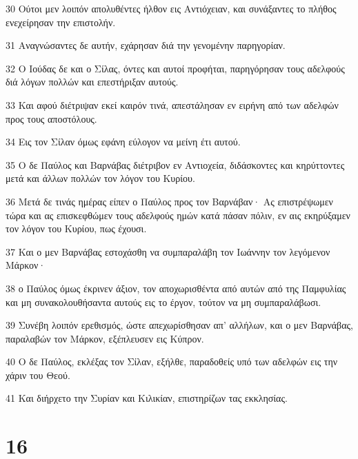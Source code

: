 \par 30 Ούτοι μεν λοιπόν απολυθέντες ήλθον εις Αντιόχειαν, και συνάξαντες το πλήθος ενεχείρησαν την επιστολήν.
\par 31 Αναγνώσαντες δε αυτήν, εχάρησαν διά την γενομένην παρηγορίαν.
\par 32 Ο Ιούδας δε και ο Σίλας, όντες και αυτοί προφήται, παρηγόρησαν τους αδελφούς διά λόγων πολλών και επεστήριξαν αυτούς.
\par 33 Και αφού διέτριψαν εκεί καιρόν τινά, απεστάλησαν εν ειρήνη από των αδελφών προς τους αποστόλους.
\par 34 Εις τον Σίλαν όμως εφάνη εύλογον να μείνη έτι αυτού.
\par 35 Ο δε Παύλος και Βαρνάβας διέτριβον εν Αντιοχεία, διδάσκοντες και κηρύττοντες μετά και άλλων πολλών τον λόγον του Κυρίου.
\par 36 Μετά δε τινάς ημέρας είπεν ο Παύλος προς τον Βαρνάβαν· Ας επιστρέψωμεν τώρα και ας επισκεφθώμεν τους αδελφούς ημών κατά πάσαν πόλιν, εν αις εκηρύξαμεν τον λόγον του Κυρίου, πως έχουσι.
\par 37 Και ο μεν Βαρνάβας εστοχάσθη να συμπαραλάβη τον Ιωάννην τον λεγόμενον Μάρκον·
\par 38 ο Παύλος όμως έκρινεν άξιον, τον αποχωρισθέντα από αυτών από της Παμφυλίας και μη συνακολουθήσαντα αυτούς εις το έργον, τούτον να μη συμπαραλάβωσι.
\par 39 Συνέβη λοιπόν ερεθισμός, ώστε απεχωρίσθησαν απ' αλλήλων, και ο μεν Βαρνάβας, παραλαβών τον Μάρκον, εξέπλευσεν εις Κύπρον.
\par 40 Ο δε Παύλος, εκλέξας τον Σίλαν, εξήλθε, παραδοθείς υπό των αδελφών εις την χάριν του Θεού.
\par 41 Και διήρχετο την Συρίαν και Κιλικίαν, επιστηρίζων τας εκκλησίας.

\chapter{16}

